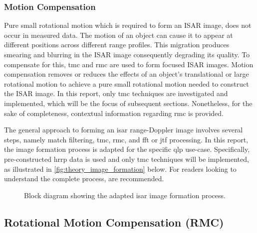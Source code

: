 \documentclass[class=report,11pt,crop=false]{standalone}
\begin{document}
    \subsubsection{Motion Compensation}
    Pure small rotational motion which is required to form an ISAR image, does not occur in measured data. The motion of an object can cause it to appear at different positions across different range profiles. This migration produces smearing and blurring in the ISAR image consequently degrading its quality. To compensate for this, \gls{tmc} and \gls{rmc} are used to form focused ISAR images. Motion compensation removes or reduces the effects of an object's translational or large rotational motion to achieve a pure small rotational motion needed to construct the ISAR image. In this report, only \gls{tmc} techniques are investigated and implemented, which will be the focus of subsequent sections. Nonetheless, for the sake of completeness, contextual information regarding \gls{rmc} is provided.
    
    The general approach to forming an \gls{isar} range-Doppler image involves several steps, namely match filtering, \gls{tmc}, \gls{rmc}, and \gls{fft} or \gls{jtf} processing. In this report, the image formation process is adapted for the specific \gls{qlp} use-case.  Specifically, pre-constructed \gls{hrrp} data is used and only \gls{tmc} techniques will be implemented, as illustrated in \autoref{fig:theory_image_formation} below. For readers looking to understand the complete process, \cite{ISARtextbook_Martorella,ISARtextbook_Matlab,yunus} are recommended.
    
    \begin{figure}[h]
        \centering
        \resizebox{\linewidth}{!}{}
        \caption{Block diagram showing the adapted \gls{isar} image formation process. \label{fig:theory_image_formation}}
    \end{figure}
       
    \subsection{Rotational Motion Compensation (RMC)} %
    
\end{document}
